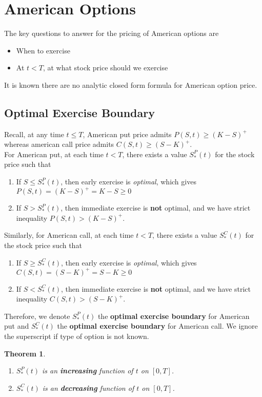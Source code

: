 \documentclass[12pt]{article}
\newtheorem{theorem}{Theorem}[section]
\theoremstyle{definition}
\begin{document}
\section{American Options}
The key questions to answer for the pricing of American options are
\begin{itemize}
  \item When to exercise
  \item At $t<T$, at what stock price should we exercise
\end{itemize}
It is known there are no analytic closed form formula for American option price.
\subsection{Optimal Exercise Boundary}
Recall, at any time $t\leq T$, American put price admits $P(S,t)\geq (K-S)^{+}$ whereas american call price admits $C(S,t)\geq (S-K)^{+}$.\\
For American put, at each time $t<T$, there exists a value $S^P_{\ast}(t)$ for the stock price such that
\begin{enumerate}
  \item If $S\leq S^P_{\ast}(t)$, then early exercise is \textit{optimal}, which gives $P(S,t)=(K-S)^{+}=K-S\geq 0$
  \item If $S>S^P_{\ast}(t)$, then immediate exercise is \textbf{not} optimal, and we have strict inequality $P(S,t)>(K-S)^{+}$.
\end{enumerate}
Similarly, for American call, at each time $t<T$, there exists a value $S^C_{\ast}(t)$ for the stock price such that
\begin{enumerate}
  \item If $S\geq S^C_{\ast}(t)$, then early exercise is \textit{optimal}, which gives $C(S,t)=(S-K)^{+}=S-K\geq 0$
  \item If $S<S^C_{\ast}(t)$, then immediate exercise is \textbf{not} optimal, and we have strict inequality $C(S,t)>(S-K)^{+}$.
\end{enumerate}
Therefore, we denote $S_\ast^P(t)$ the \textbf{optimal exercise boundary} for American put and $S_\ast^C(t)$ the \textbf{optimal exercise boundary} for American call. We ignore the superscript if type of option is not known.
\begin{theorem}
\hfill\\\normalfont\begin{enumerate}
\item $S_\ast^P(t)$ is an \textbf{increasing} function of $t$ on $[0,T]$.
\item $S_\ast^C(t)$ is an \textbf{decreasing} function of $t$ on $[0,T]$.
\end{enumerate}
\end{theorem}
\end{document}
